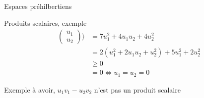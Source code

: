 \begin{parag}{Espaces préhilbertiens}
\begin{subparag}{Produits scalaires, exemple}
\begin{align*}
\begin{pmatrix}
                    u_1 \\ u_2 
                \end{pmatrix}\rangle &= 7u_1^2 + 4u_1u_2 + 4u_2^2\\
                &= 2(u_1^2 + 2u_1u_2 + u_2^2) + 5 u_1^2 + 2u_2^2\\
                &\geq 0\\
                &= 0 \Leftrightarrow u_1 = u_2 = 0
                \end{align*}
                \begin{framedremark}
                    Exemple à avoir, 
                    $u_1v_1 - u_2v_2$ n'est pas un produit scalaire
                \end{framedremark}      
            \end{subparag}
        \end{parag}
